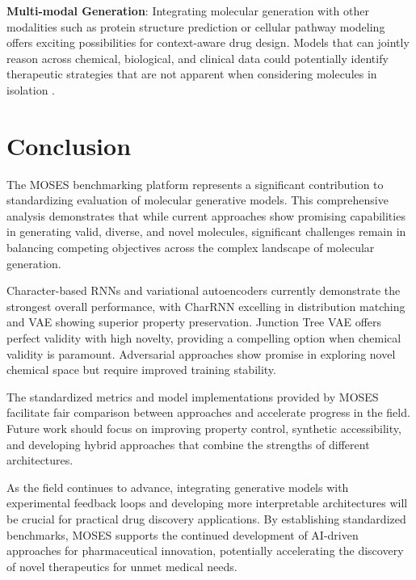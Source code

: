 \documentclass[conference]{IEEEtran}
\begin{document}
\textbf{Multi-modal Generation}: Integrating molecular generation with other modalities such as protein structure prediction or cellular pathway modeling offers exciting possibilities for context-aware drug design. Models that can jointly reason across chemical, biological, and clinical data could potentially identify therapeutic strategies that are not apparent when considering molecules in isolation \cite{Maragakis2020}.

\section{Conclusion}
The MOSES benchmarking platform represents a significant contribution to standardizing evaluation of molecular generative models. This comprehensive analysis demonstrates that while current approaches show promising capabilities in generating valid, diverse, and novel molecules, significant challenges remain in balancing competing objectives across the complex landscape of molecular generation.

Character-based RNNs and variational autoencoders currently demonstrate the strongest overall performance, with CharRNN excelling in distribution matching and VAE showing superior property preservation. Junction Tree VAE offers perfect validity with high novelty, providing a compelling option when chemical validity is paramount. Adversarial approaches show promise in exploring novel chemical space but require improved training stability.

The standardized metrics and model implementations provided by MOSES facilitate fair comparison between approaches and accelerate progress in the field. Future work should focus on improving property control, synthetic accessibility, and developing hybrid approaches that combine the strengths of different architectures.

As the field continues to advance, integrating generative models with experimental feedback loops and developing more interpretable architectures will be crucial for practical drug discovery applications. By establishing standardized benchmarks, MOSES supports the continued development of AI-driven approaches for pharmaceutical innovation, potentially accelerating the discovery of novel therapeutics for unmet medical needs.



\end{document}
